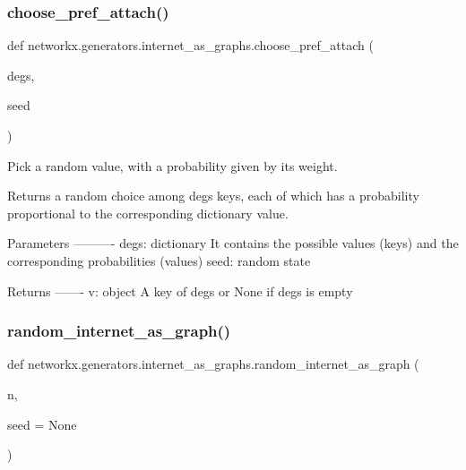 \subsubsection{\texorpdfstring{choose\+\_\+pref\+\_\+attach()}{choose\_pref\_attach()}}
{\footnotesize\ttfamily def networkx.\+generators.\+internet\+\_\+as\+\_\+graphs.\+choose\+\_\+pref\+\_\+attach (\begin{DoxyParamCaption}\item[{}]{degs,  }\item[{}]{seed }\end{DoxyParamCaption})}

\begin{DoxyVerb}Pick a random value, with a probability given by its weight.

Returns a random choice among degs keys, each of which has a
probability proportional to the corresponding dictionary value.

Parameters
----------
degs: dictionary
    It contains the possible values (keys) and the corresponding
    probabilities (values)
seed: random state

Returns
-------
v: object
    A key of degs or None if degs is empty
\end{DoxyVerb}
 \mbox{\label{namespacenetworkx_1_1generators_1_1internet__as__graphs_a0615563501ff2b39c8beaa26114feb37}} 
\subsubsection{\texorpdfstring{random\+\_\+internet\+\_\+as\+\_\+graph()}{random\_internet\_as\_graph()}}
{\footnotesize\ttfamily def networkx.\+generators.\+internet\+\_\+as\+\_\+graphs.\+random\+\_\+internet\+\_\+as\+\_\+graph (\begin{DoxyParamCaption}\item[{}]{n,  }\item[{}]{seed = {\ttfamily None} }\end{DoxyParamCaption})}

